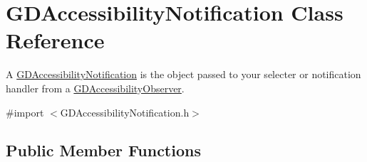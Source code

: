 \hypertarget{interface_g_d_accessibility_notification}{
\section{GDAccessibilityNotification Class Reference}
\label{interface_g_d_accessibility_notification}
}


A \hyperlink{interface_g_d_accessibility_notification}{GDAccessibilityNotification} is the object passed to your selecter or notification handler from a \hyperlink{interface_g_d_accessibility_observer}{GDAccessibilityObserver}.  


{\ttfamily \#import $<$GDAccessibilityNotification.h$>$}\subsection*{Public Member Functions}
